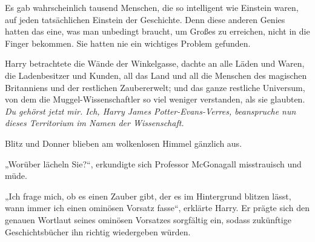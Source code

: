 Es gab wahrscheinlich tausend Menschen, die so intelligent wie Einstein waren, auf jeden tatsächlichen Einstein der Geschichte. Denn diese anderen Genies hatten das eine, was man unbedingt braucht, um Großes zu erreichen, nicht in die Finger bekommen. Sie hatten nie ein wichtiges Problem gefunden.

Harry betrachtete die Wände der Winkelgasse, dachte an alle Läden und Waren, die Ladenbesitzer und Kunden, all das Land und all die Menschen des magischen Britanniens und der restlichen Zaubererwelt; und das ganze restliche Universum, von dem die Muggel-Wissenschaftler so viel weniger verstanden, als sie glaubten. \emph{Du gehörst jetzt mir. Ich, Harry James Potter-Evans-Verres, beanspruche nun dieses Territorium im Namen der Wissenschaft.}

Blitz und Donner blieben am wolkenlosen Himmel gänzlich aus.

„Worüber lächeln Sie?“, erkundigte sich Professor McGonagall misstrauisch und müde.

„Ich frage mich, ob es einen Zauber gibt, der es im Hintergrund blitzen lässt, wann immer ich einen ominösen Vorsatz fasse“, erklärte Harry. Er prägte sich den genauen Wortlaut seines ominösen Vorsatzes sorgfältig ein, sodass zukünftige Geschichtsbücher ihn richtig wiedergeben würden.

